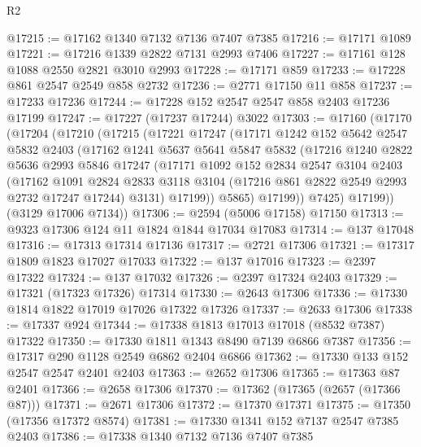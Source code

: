 \begin{lexlean}{R2}
\begin{coremodule}
@17215 := @17162 @1340 @7132 @7136 @7407 @7385
@17216 := @17171 @1089
@17221 := @17216 @1339 @2822 @7131 @2993 @7406
@17227 := @17161 @128 @1088 @2550 @2821 @3010 @2993
@17228 := @17171 @859
@17233 := @17228 @861 @2547 @2549 @858 @2732
@17236 := @2771 @17150 @11 @858
@17237 := @17233 @17236
@17244 := @17228 @152 @2547 @2547 @858 @2403 @17236 @17199
@17247 := @17227 (@17237 @17244) @3022
@17303 := @17160
    (@17170
      (@17204
        (@17210
          (@17215
            (@17221
              @17247
              (@17171
                @1242
                @152
                @5642
                @2547
                @5832
                @2403
                (@17162
                  @1241
                  @5637
                  @5641
                  @5847
                  @5832
                  (@17216
                    @1240
                    @2822
                    @5636
                    @2993
                    @5846
                    @17247
                    (@17171
                      @1092
                      @152
                      @2834
                      @2547
                      @3104
                      @2403
                      (@17162
                        @1091
                        @2824
                        @2833
                        @3118
                        @3104
                        (@17216 @861 @2822 @2549 @2993 @2732 @17247 @17244)
                        @3131)
                      @17199))
                  @5865)
                @17199))
            @7425)
          @17199))
      (@3129 @17006 @7134))
@17306 := @2594 (@5006 @17158) @17150
@17313 := @9323 @17306 @124 @11 @1824 @1844 @17034 @17083
@17314 := @137 @17048
@17316 := @17313 @17314 @17136
@17317 := @2721 @17306
@17321 := @17317 @1809 @1823 @17027 @17033
@17322 := @137 @17016
@17323 := @2397 @17322
@17324 := @137 @17032
@17326 := @2397 @17324 @2403
@17329 := @17321 (@17323 @17326) @17314
@17330 := @2643 @17306
@17336 := @17330 @1814 @1822 @17019 @17026 @17322 @17326
@17337 := @2633 @17306
@17338 := @17337 @924
@17344 := @17338 @1813 @17013 @17018 (@8532 @7387) @17322
@17350 := @17330 @1811 @1343 @8490 @7139 @6866 @7387
@17356 := @17317 @290 @1128 @2549 @6862 @2404 @6866
@17362 := @17330 @133 @152 @2547 @2547 @2401 @2403
@17363 := @2652 @17306
@17365 := @17363 @87 @2401
@17366 := @2658 @17306
@17370 := @17362 (@17365 (@2657 (@17366 @87)))
@17371 := @2671 @17306
@17372 := @17370 @17371
@17375 := @17350 (@17356 @17372 @8574)
@17381 := @17330 @1341 @152 @7137 @2547 @7385 @2403
@17386 := @17338 @1340 @7132 @7136 @7407 @7385

\end{coremodule}
\end{lexlean}
